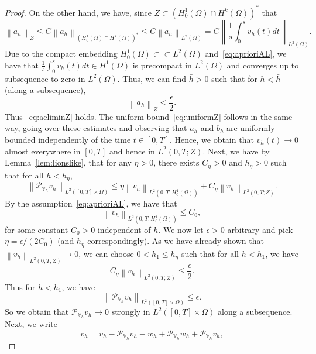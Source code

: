 \documentclass[10pt,letterpaper]{amsart}
\newcommand\norm[1]{\left\lVert#1\right\rVert}
\newcommand{\dom}{\Omega}
\newcommand{\Vh}{\mathbb{V}_h}
\newcommand{\PVh}{\mathcal{P}_{\Vh}}
\theoremstyle{definition}{\newtheorem{definition}[lemma]{Definition}}
\numberwithin{equation}{section}
\begin{document}
\begin{proof}
	On the other hand, we have, since $Z\subset (H^1_0(\dom)\cap H^k(\dom))^*$ that
	\begin{equation*}
		\norm{a_h}_{Z}\leq C \norm{a_h}_{(H^1_0(\dom)\cap H^k(\dom))^*} \leq  C \norm{a_h}_{L^2(\dom)}= C \norm{\frac{1}{s}\int_0^s v_h(t)dt}_{L^2(\dom)}.%
	\end{equation*}
	Due to the compact embedding $H^1_0(\dom)\subset\subset L^2(\dom)$ and~\eqref{eq:aprioriAL}, we have that $\frac{1}{s}\int_0^s v_h(t)dt\in H^1(\dom)$ is precompact in $L^2(\dom)$ and converges up to subsequence to zero in $L^2(\dom)$.
	Thus, we can find $\bar{h}>0$ such that for $h<\bar{h}$ (along a subsequence),
	\begin{equation*}
		\norm{a_h}_{Z}<\frac{\epsilon}{2}.
	\end{equation*}
	Thus~\eqref{eq:aeliminZ} holds.
	The uniform bound~\eqref{eq:uniformZ} follows in the same way, going over these estimates and observing that $a_h$ and $b_h$ are uniformly bounded independently of the time $t\in [0,T]$. 
	Hence, we obtain that $v_h(t)\to 0$ almost everywhere in $[0,T]$ and hence in $L^2(0,T;Z)$.
	Next, we have by Lemma~\ref{lem:lionslike},  that for any $\eta>0$, there exists $C_{\eta}>0$ and $h_\eta>0$ such that for all $h<h_\eta$,
	\begin{equation*}
		\norm{\PVh v_h}_{L^2([0,T]\times\dom)}\leq \eta \norm{v_h}_{L^2(0,T;H^1_0(\dom))}+C_{\eta}\norm{v_h}_{L^2(0,T;Z)}.
	\end{equation*}
	By the assumption~\eqref{eq:aprioriAL}, we have that
	\begin{equation*}
		\norm{v_h}_{L^2(0,T;H^1_0(\dom))}\leq C_0,
	\end{equation*}
	for some constant $C_0>0$ independent of $h$. 
	We now let $\epsilon>0$ arbitrary and pick $\eta = \epsilon/(2 C_0)$ (and $h_\eta$ correspondingly). As we have already shown that $\norm{v_h}_{L^2(0,T;Z)}\to 0$, we can choose $0<h_1\leq h_\eta$ such that for all $h<h_1$, we have
	\begin{equation*}
		C_\eta\norm{v_h}_{L^2(0,T;Z)}\leq \frac{\epsilon}{2}.
	\end{equation*}
	Thus for $h<h_1$, we have
	\begin{equation}\label{eq:PVhvconv}
		\norm{\PVh v_h}_{L^2([0,T]\times\dom)}\leq \epsilon.
	\end{equation}
	So we obtain that $\PVh v_h \to 0$ strongly in $L^2([0,T]\times\dom)$ along a subsequence. Next, we write
	\begin{equation*}
		v_h = v_h - \PVh v_h -w_h +\PVh w_h +\PVh v_h,

\end{equation*}
\end{proof}
\end{document}
